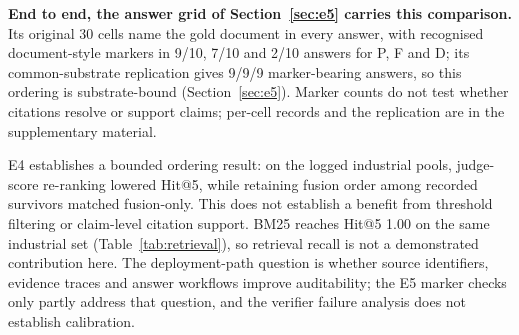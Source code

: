 \textbf{End to end, the answer grid of Section~\ref{sec:e5} carries this
comparison.} Its original 30 cells name the gold document in every answer,
with recognised document-style markers in 9/10, 7/10 and 2/10 answers for P, F
and D; its common-substrate replication gives 9/9/9 marker-bearing answers, so
this ordering is substrate-bound (Section~\ref{sec:e5}). Marker counts do not test whether
citations resolve or support claims; per-cell records and the replication are
in the supplementary material.


E4 establishes a bounded ordering result: on the logged industrial pools,
judge-score re-ranking lowered Hit@5, while retaining fusion order among
recorded survivors matched fusion-only. This does not establish a benefit from
threshold filtering or claim-level citation support. BM25 reaches Hit@5 1.00
on the same industrial set (Table~\ref{tab:retrieval}), so retrieval recall is
not a demonstrated contribution here. The deployment-path question is whether
source identifiers, evidence traces and answer workflows improve auditability;
the E5 marker checks only partly address that question, and the verifier
failure analysis does not establish calibration.

